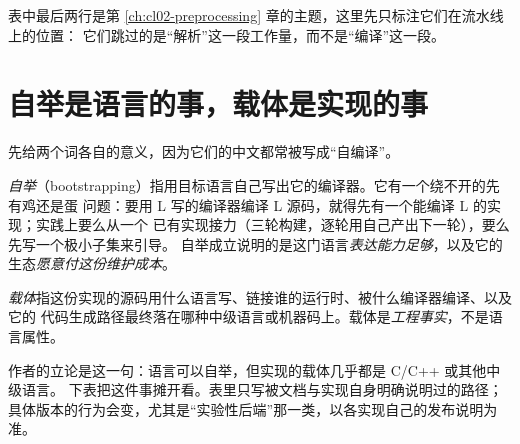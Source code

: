 \documentclass[12pt,a4paper,fontset=fandol]{ctexbook}
\newcommand{\Bk}{\discretionary{}{}{}}
\newcommand{\Lang}[1]{\textsf{#1}}
\newcommand{\CL}{\Lang{C}}
\newcommand{\CPP}{\Lang{C++}}
\newcommand{\Mx}[1]{\textsf{#1}}
\begin{document}
表中最后两行是第 \ref{ch:cl02-preprocessing} 章的主题，这里先只标注它们在流水线上的位置：
它们跳过的是“解析”这一段工作量，而不是“编译”这一段。

\section{自举是语言的事，载体是实现的事}\label{sec:cl01-carrier}

先给两个词各自的意义，因为它们的中文都常被写成“自编译”。

\emph{自举}（\Mx{boot{\Bk}strapping}）指用目标语言自己写出它的编译器。它有一个绕不开的先有鸡还是蛋
问题：要用 \Mx{L} 写的编译器编译 \Mx{L} 源码，就得先有一个能编译 \Mx{L} 的实现；实践上要么从一个
已有实现接力（三轮构建，逐轮用自己产出下一轮），要么先写一个极小子集来引导。
自举成立说明的是这门语言\emph{表达能力足够}，以及它的生态\emph{愿意付这份维护成本}。

\emph{载体}指这份实现的源码用什么语言写、链接谁的运行时、被什么编译器编译、以及它的
代码生成路径最终落在哪种中级语言或机器码上。载体是\emph{工程事实}，不是语言属性。

作者的立论是这一句：语言可以自举，但实现的载体几乎都是 \CL{}/\CPP{} 或其他中级语言。
下表把这件事摊开看。表里只写被文档与实现自身明确说明过的路径；
具体版本的行为会变，尤其是“实验性后端”那一类，以各实现自己的发布说明为准。
\end{document}

